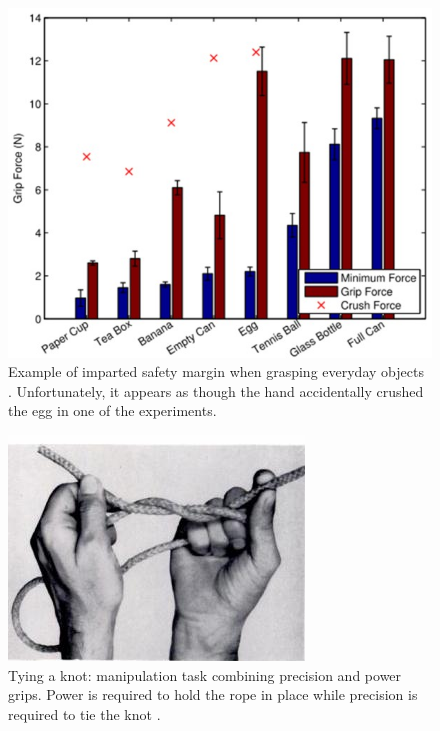 \begin{figure}[hbt]
	\centering
	\includegraphics[width=\linewidth]{images/grip_crush_force}
	\caption{Example of imparted safety margin when grasping everyday objects \cite{romano2011human}.
Unfortunately, it appears as though the hand accidentally crushed the egg in one of the experiments.}
	\label{fig:grip_crush_force}
\end{figure}

\begin{figure}[hbt]
	\centering
	\includegraphics[width=\linewidth]{images/tie_rope}
	\caption{Tying a knot: manipulation task combining precision and power grips.
Power is required to hold the rope in place while precision is required to tie the knot \cite{hopfield1995pattern}.}
	\label{fig:tie_rope}
\end{figure}



